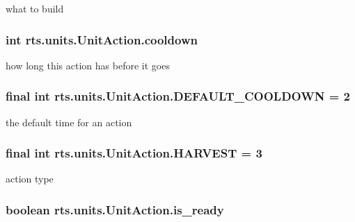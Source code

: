 \label{classrts_1_1units_1_1_unit_action_a9580a2a6c1e668979f0ea0059e55988c}
what to build \hypertarget{classrts_1_1units_1_1_unit_action_a87be8a59b99c285c0677e62c89965a9d}{
\subsubsection[{cooldown}]{\setlength{\rightskip}{0pt plus 5cm}int {\bf rts.units.UnitAction.cooldown}}}
\label{classrts_1_1units_1_1_unit_action_a87be8a59b99c285c0677e62c89965a9d}
how long this action has before it goes \hypertarget{classrts_1_1units_1_1_unit_action_a0462fdf20229245768be2a8382c58ca7}{
\subsubsection[{DEFAULT\_\-COOLDOWN}]{\setlength{\rightskip}{0pt plus 5cm}final int {\bf rts.units.UnitAction.DEFAULT\_\-COOLDOWN} = 2}}
\label{classrts_1_1units_1_1_unit_action_a0462fdf20229245768be2a8382c58ca7}
the default time for an action \hypertarget{classrts_1_1units_1_1_unit_action_af9e653a5d2fb925d3e15f96849f0586a}{
\subsubsection[{HARVEST}]{\setlength{\rightskip}{0pt plus 5cm}final int {\bf rts.units.UnitAction.HARVEST} = 3}}
\label{classrts_1_1units_1_1_unit_action_af9e653a5d2fb925d3e15f96849f0586a}
action type \hypertarget{classrts_1_1units_1_1_unit_action_a2bbb072721d535c656269075f6ce813d}{
\subsubsection[{is\_\-ready}]{\setlength{\rightskip}{0pt plus 5cm}boolean {\bf rts.units.UnitAction.is\_\-ready}}}
